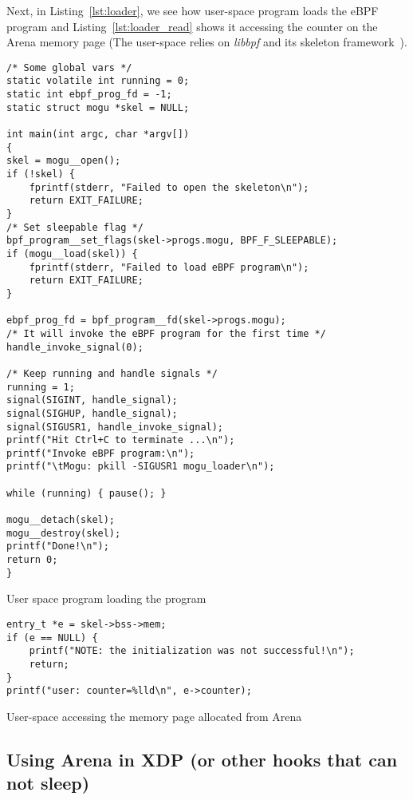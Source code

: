 \documentclass{article}
\begin{document}
Next, in Listing~\ref{lst:loader}, we see how user-space program loads the eBPF
program and Listing~\ref{lst:loader_read} shows it accessing the counter on the
Arena memory page (The user-space relies on \emph{libbpf} and its skeleton
framework~\cite{libbpf_skeleton}).

\begin{listing}
\begin{verbatim}
/* Some global vars */
static volatile int running = 0;
static int ebpf_prog_fd = -1;
static struct mogu *skel = NULL;

int main(int argc, char *argv[])
{
skel = mogu__open();
if (!skel) {
    fprintf(stderr, "Failed to open the skeleton\n");
    return EXIT_FAILURE;
}
/* Set sleepable flag */
bpf_program__set_flags(skel->progs.mogu, BPF_F_SLEEPABLE);
if (mogu__load(skel)) {
    fprintf(stderr, "Failed to load eBPF program\n");
    return EXIT_FAILURE;
}

ebpf_prog_fd = bpf_program__fd(skel->progs.mogu);
/* It will invoke the eBPF program for the first time */
handle_invoke_signal(0);

/* Keep running and handle signals */
running = 1;
signal(SIGINT, handle_signal);
signal(SIGHUP, handle_signal);
signal(SIGUSR1, handle_invoke_signal);
printf("Hit Ctrl+C to terminate ...\n");
printf("Invoke eBPF program:\n");
printf("\tMogu: pkill -SIGUSR1 mogu_loader\n");

while (running) { pause(); }

mogu__detach(skel);
mogu__destroy(skel);
printf("Done!\n");
return 0;
}
\end{verbatim}
\caption{User space program loading the program}
\label{lst:loader}
\end{listing}

\begin{listing}
\begin{verbatim}
entry_t *e = skel->bss->mem;
if (e == NULL) {
    printf("NOTE: the initialization was not successful!\n");
    return;
}
printf("user: counter=%lld\n", e->counter);
\end{verbatim}
\caption{User-space accessing the memory page allocated from Arena}
\label{lst:loader_read}
\end{listing}


\subsection{Using Arena in XDP (or other hooks that can not sleep)}
\end{document}
